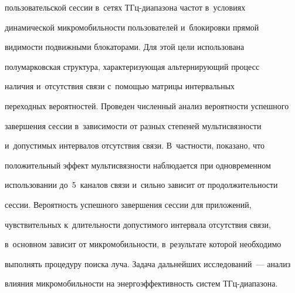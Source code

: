 пользовательской сессии в~сетях ТГц-диапазона частот в~условиях 


динамической мик\-ро\-мо\-биль\-ности пользователей и~блокировки прямой 


видимости подвижными блокаторами. Для этой цели использована 


полумарковская структура, ха\-рак\-те\-ри\-зу\-ющая альтернирующий процесс 


наличия и~отсутствия связи с~по\-мощью мат\-ри\-цы интервальных 


переходных вероятностей. Проведен чис\-лен\-ный анализ вероятности успешного 


завершения сессии в~зависимости от разных степеней мультисвязности 


и~допустимых интервалов отсутствия связи. В~част\-ности, показано, что 


положительный эффект муль\-ти\-связ\-ности наблюдается при одновременном 


использовании до~5~каналов связи и~сильно зависит от продолжительности 


сессии. Ве\-ро\-ят\-ность успеш\-но\-го завершения сессии для приложений, 


чувствительных к~дли\-тель\-ности до\-пус\-ти\-мо\-го интервала отсутствия связи, 


в~основном зависит от мик\-ро\-мо\-биль\-ности, в~результате которой необходимо 


выполнять процедуру поиска луча. Задача дальнейших исследований~--- анализ 


влияния мик\-ро\-мо\-биль\-ности на энер\-го\-эф\-фек\-тив\-ность сис\-тем ТГц-диа\-па\-зона.





